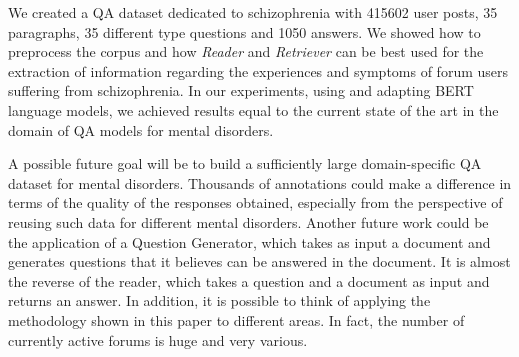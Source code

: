 \documentclass[runningheads]{llncs}
\begin{document}
We created a QA dataset dedicated to schizophrenia with 415602 user posts, 35 paragraphs, 35 different type questions and 1050 answers.
We showed how to preprocess the corpus and how \emph{Reader} and \emph{Retriever} can be best used for the extraction of information regarding the experiences and symptoms of forum users suffering from schizophrenia. In our experiments, using and adapting BERT language models, we achieved results equal to the current state of the art in the domain of QA models for mental disorders.

A possible future goal will be to build a sufficiently large domain-specific QA dataset for mental disorders. Thousands of annotations could make a difference in terms of the quality of the responses obtained, especially from the perspective of reusing such data for different mental disorders.
Another future work could be the application of a Question Generator, which takes as input a document and generates questions that it believes can be answered in the \cite{c41} document. It is almost the reverse of the reader, which takes a question and a document as input and returns an answer.
In addition, it is possible to think of applying the methodology shown in this paper to different areas. In fact, the number of currently active forums is huge and very various.
\end{document}
